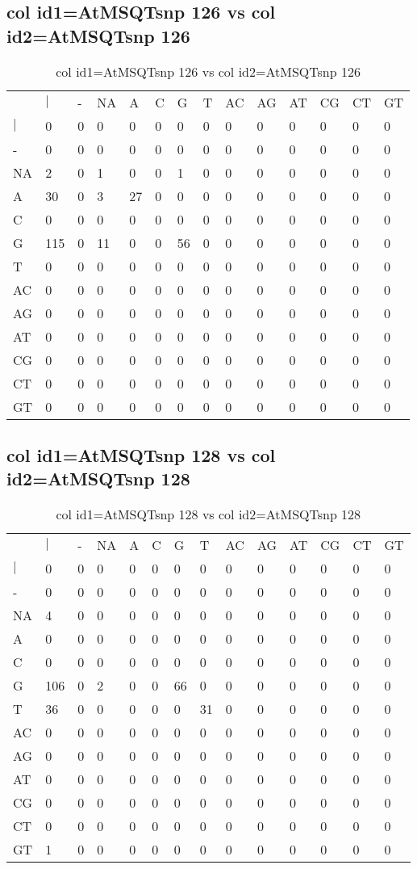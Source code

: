\subsection{col id1=AtMSQTsnp 126 vs col id2=AtMSQTsnp 126}
\begin{center}
\begin{longtable}{|l|l|l|l|l|l|l|l|l|l|l|l|l|l|}
\caption{col id1=AtMSQTsnp 126 vs col id2=AtMSQTsnp 126} \label{table_dm514}\\
\hline
\\
\hline
&$|$&-&NA&A&C&G&T&AC&AG&AT&CG&CT&GT\\
$|$&0&0&0&0&0&0&0&0&0&0&0&0&0\\
-&0&0&0&0&0&0&0&0&0&0&0&0&0\\
NA&2&0&1&0&0&1&0&0&0&0&0&0&0\\
A&30&0&3&27&0&0&0&0&0&0&0&0&0\\
C&0&0&0&0&0&0&0&0&0&0&0&0&0\\
G&115&0&11&0&0&56&0&0&0&0&0&0&0\\
T&0&0&0&0&0&0&0&0&0&0&0&0&0\\
AC&0&0&0&0&0&0&0&0&0&0&0&0&0\\
AG&0&0&0&0&0&0&0&0&0&0&0&0&0\\
AT&0&0&0&0&0&0&0&0&0&0&0&0&0\\
CG&0&0&0&0&0&0&0&0&0&0&0&0&0\\
CT&0&0&0&0&0&0&0&0&0&0&0&0&0\\
GT&0&0&0&0&0&0&0&0&0&0&0&0&0\\
\hline
\end{longtable}
\end{center}

\subsection{col id1=AtMSQTsnp 128 vs col id2=AtMSQTsnp 128}
\begin{center}
\begin{longtable}{|l|l|l|l|l|l|l|l|l|l|l|l|l|l|}
\caption{col id1=AtMSQTsnp 128 vs col id2=AtMSQTsnp 128} \label{table_dm516}\\
\hline
\\
\hline
&$|$&-&NA&A&C&G&T&AC&AG&AT&CG&CT&GT\\
$|$&0&0&0&0&0&0&0&0&0&0&0&0&0\\
-&0&0&0&0&0&0&0&0&0&0&0&0&0\\
NA&4&0&0&0&0&0&0&0&0&0&0&0&0\\
A&0&0&0&0&0&0&0&0&0&0&0&0&0\\
C&0&0&0&0&0&0&0&0&0&0&0&0&0\\
G&106&0&2&0&0&66&0&0&0&0&0&0&0\\
T&36&0&0&0&0&0&31&0&0&0&0&0&0\\
AC&0&0&0&0&0&0&0&0&0&0&0&0&0\\
AG&0&0&0&0&0&0&0&0&0&0&0&0&0\\
AT&0&0&0&0&0&0&0&0&0&0&0&0&0\\
CG&0&0&0&0&0&0&0&0&0&0&0&0&0\\
CT&0&0&0&0&0&0&0&0&0&0&0&0&0\\
GT&1&0&0&0&0&0&0&0&0&0&0&0&0\\
\hline
\end{longtable}
\end{center}

